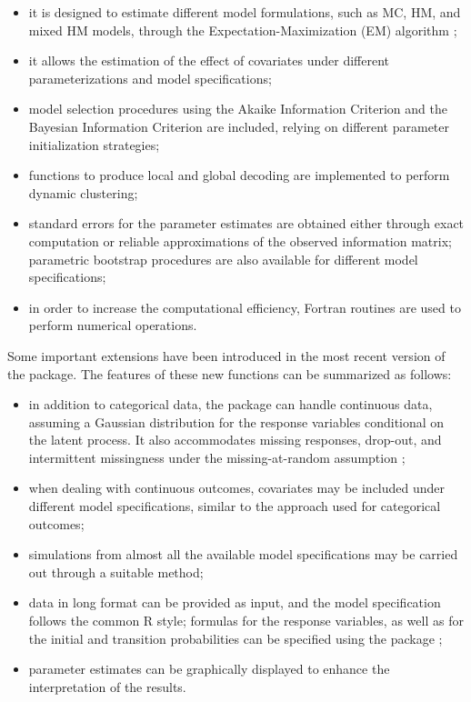 \begin{itemize}
\item
  it is designed to estimate different model formulations, such as MC,
  HM, and mixed HM models, through the Expectation-Maximization (EM)
  algorithm \citep{demp:lair:rubi:77};
\item
  it allows the estimation of the effect of covariates under different
  parameterizations and model specifications;
\item
  model selection procedures using the Akaike Information Criterion
  \citep[AIC,][]{aka:73} and the Bayesian Information Criterion
  \citep[BIC,][]{sch:78} are included, relying on different parameter
  initialization strategies;
\item
  functions to produce local and global decoding are implemented to
  perform dynamic clustering;
\item
  standard errors for the parameter estimates are obtained either
  through exact computation or reliable approximations of the observed
  information matrix; parametric bootstrap procedures
  \citep{davison:hynkley:1997} are also available for different model
  specifications;
\item
  in order to increase the computational efficiency, Fortran routines
  are used to perform numerical operations.
\end{itemize}

Some important extensions have been introduced in the most recent version of the package. The features of these new functions can be summarized as follows:

\begin{itemize}
\item
  in addition to categorical data, the package can handle continuous
  data, assuming a Gaussian distribution for the response variables
  conditional on the latent process. It also accommodates missing
  responses, drop-out, and intermittent missingness under the
  missing-at-random assumption \citep[MAR,][]{little:rub:20};
\item
  when dealing with continuous outcomes, covariates may be included
  under different model specifications, similar to the approach used
  for categorical outcomes;
\item
  simulations from almost all the available model specifications may
  be carried out through a suitable method;
\item
  data in long format can be provided as input, and the model
  specification follows the common \textsf{R} style; formulas for the response variables, as well as for the initial and transition probabilities can be
  specified using the package  \citep{zeil:croi:10};
\item
  parameter estimates can be graphically displayed to enhance the
  interpretation of the results.
\end{itemize}

